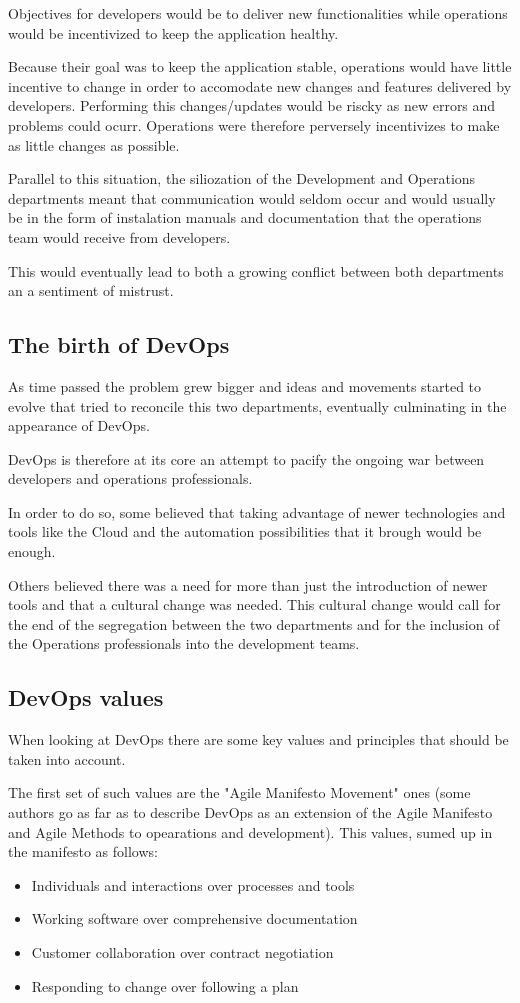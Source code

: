 \documentclass[runningheads,a4paper]{llncs}
\begin{document}
Objectives for developers would be to deliver new functionalities while operations would be incentivized to keep the application healthy.

Because their goal was to keep the application stable, operations would have little incentive to change in order to accomodate new changes and features delivered by developers. Performing this changes/updates would be riscky as new errors and problems could ocurr. Operations were therefore perversely incentivizes to make as little changes as possible.

Parallel to this situation, the siliozation of the Development and Operations departments meant that communication would seldom occur and would usually be in the form of instalation manuals and documentation that the operations team would receive from developers.

This would eventually lead to both a growing conflict between both departments an a sentiment of mistrust.

\subsection{The birth of DevOps}
As time passed the problem grew bigger and ideas and movements started to evolve that tried to reconcile this two departments, eventually culminating in the appearance of DevOps.

DevOps is therefore at its core an attempt to pacify the ongoing war between developers and operations professionals. 

In order to do so, some believed that taking advantage of newer technologies and tools like the Cloud and the automation possibilities that it brough would be enough. 

Others believed there was a need for more than just the introduction of newer tools and that a cultural change was needed. This cultural change would call for the end of the segregation between the two departments and for the inclusion of the Operations professionals into the development teams.

\subsection{DevOps values}

When looking at DevOps there are some key values and principles that should be taken into account. 

The first set of such values are the "Agile Manifesto Movement" ones (some authors go as far as to describe DevOps as an extension of the Agile Manifesto and Agile Methods to opearations and development). This values, sumed up in the manifesto as follows:
	\begin{itemize}
		\item Individuals and interactions over processes and tools
		\item Working software over comprehensive documentation
		\item Customer collaboration over contract negotiation
		\item Responding to change over following a plan
	\end{itemize}	
\end{document}
